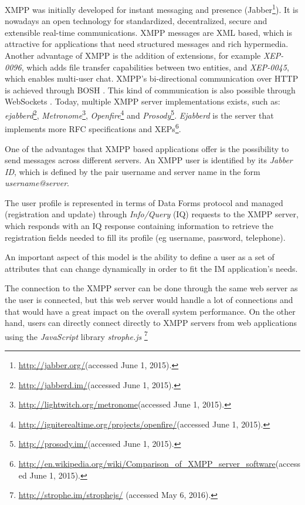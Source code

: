   \ac{XMPP} was initially developed for instant messaging and presence (Jabber\footnote{\url{http://jabber.org/}(accessed June 1, 2015).}). It is nowadays an open technology for standardized, decentralized, secure and extensible real-time communications. 
  \ac{XMPP} messages are \ac{XML} based, which is attractive for applications that need structured messages and rich hypermedia. Another advantage of \ac{XMPP} is the addition of extensions, for example \emph{XEP-0096}\cite{xep0096}, which adds file transfer capabilities between two entities, and \emph{XEP-0045}\cite{xep0045}, which enables multi-user chat.
  \ac{XMPP}'s bi-directional communication over \ac{HTTP} is achieved through \ac{BOSH} \cite{xep0206}.
  This kind of communication is also possible through WebSockets \cite{rfc7395}.
  Today, multiple \ac{XMPP} server implementations exists, such as: \emph{ejabberd}\footnote{\url{http://jabberd.im/}(accessed June 1, 2015).}, \emph{Metronome}\footnote{\url{http://lightwitch.org/metronome}(accessed June 1, 2015).}, \emph{Openfire}\footnote{\url{http://igniterealtime.org/projects/openfire/}(accessed June 1, 2015).} and \emph{Prosody}\footnote{\url{http://prosody.im/}(accessed June 1, 2015).}. \emph{Ejabberd} is the server that implements more \ac{RFC} specifications and \ac{XEP}s\footnote{\url{http://en.wikipedia.org/wiki/Comparison_of_XMPP_server_software}(accessed June 1, 2015).}.
  

    One of the advantages that \ac{XMPP} based applications offer is the possibility to send messages across different servers. An \ac{XMPP} user is identified by its \textit{Jabber ID}, which is defined by the pair username and server name in the form \textit{username@server}.

    The user profile is represented in terms of Data Forms\cite{xep0004} protocol and managed (registration and update) through \textit{Info/Query} (IQ) \cite{rfc3920} requests to the \ac{XMPP} server, which responds with an IQ response containing information to retrieve the registration fields needed to fill its profile (eg username, password, telephone). 
    
    An important aspect of this model is the ability to define a user as a set of attributes that can change dynamically in order to fit the \ac{IM} application's needs. 

    The connection to the \ac{XMPP} server can be done through the same web server as the user is connected, but this web server would handle a lot of connections and that would have a great impact on the overall system performance. On the other hand, users can directly connect directly to \ac{XMPP} servers from web applications using the \emph{JavaScript} library \emph{strophe.js} \footnote{\url{http://strophe.im/strophejs/} (accessed May 6, 2016).}


